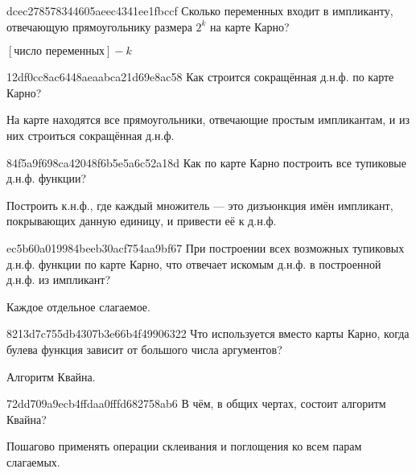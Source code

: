 \begin{note}{dcec278578344605aeec4341ee1fbccf}
    Сколько переменных входит в импликанту, отвечающую прямоугольнику размера \({ 2^{k} }\) на карте Карно?

    \begin{cloze}{1}
        \({ [\text{число переменных}] - k }\)
    \end{cloze}
\end{note}

\begin{note}{12df0cc8ac6448aeaabca21d69e8ac58}
    Как строится сокращённая д.н.ф. по карте Карно?

    \begin{cloze}{1}
        На карте находятся все прямоугольники, отвечающие простым импликантам, и из них строиться сокращённая д.н.ф.
    \end{cloze}
\end{note}

\begin{note}{84f5a9f698ca42048f6b5e5a6c52a18d}
    Как по карте Карно построить все тупиковые д.н.ф. функции?

    \begin{cloze}{1}
        Построить к.н.ф., где каждый множитель --- это дизъюнкция имён импликант, покрывающих данную единицу, и привести её к д.н.ф.
    \end{cloze}
\end{note}

\begin{note}{ec5b60a019984beeb30acf754aa9bf67}
    При построении всех возможных тупиковых д.н.ф. функции по карте Карно, что отвечает искомым д.н.ф. в построенной д.н.ф. из импликант?

    \begin{cloze}{1}
        Каждое отдельное слагаемое.
    \end{cloze}
\end{note}

\begin{note}{8213d7c755db4307b3e66b4f49906322}
    Что используется вместо карты Карно, когда булева функция зависит от большого числа аргументов?

    \begin{cloze}{1}
        Алгоритм Квайна.
    \end{cloze}
\end{note}

\begin{note}{72dd709a9ecb4ffdaa0fffd682758ab6}
    В чём, в общих чертах, состоит алгоритм Квайна?

    \begin{cloze}{1}
        Пошагово применять операции склеивания и поглощения ко всем парам слагаемых.
    \end{cloze}
\end{note}

